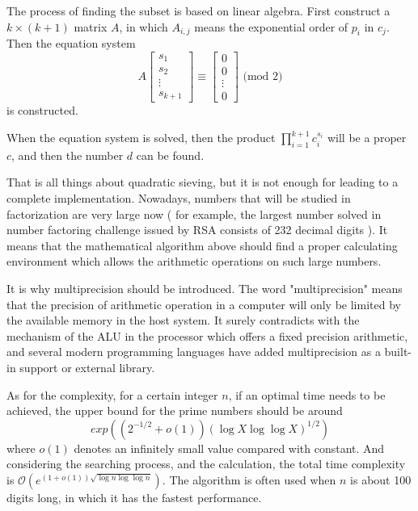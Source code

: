 \documentclass{article}
\begin{document}
The process of finding the subset is based on linear algebra. First construct a $k\times (k+1)$ matrix $A$, in which $A_{i,j}$ means the exponential order of $p_i$ in $c_j$. Then the equation system $$A\left[\begin{matrix}s_1\\s_2\\\vdots \\ s_{k+1}\end{matrix}\right] \equiv  \left[\begin{matrix}0\\0\\\vdots \\ 0\end{matrix}\right]\text{ (mod 2)}$$ is constructed. 

When the equation system is solved, then the product $\prod_{i=1}^{k+1}c_i^{s_{i}}$ will be a proper $c$, and then the number $d$ can be found.

That is all things about quadratic sieving, but it is not enough for leading to a complete implementation. Nowadays, numbers that will be studied in factorization are very large now ( for example, the largest number solved in number factoring challenge issued by RSA consists of 232 decimal digits ). It means that the mathematical algorithm above should find a proper calculating environment which allows the arithmetic operations on such large numbers. 

It is why multiprecision should be introduced. The word "multiprecision" means that the precision of arithmetic operation in a computer will only be limited by the available memory in the host system. It surely contradicts with the mechanism of the ALU in the processor which offers a fixed precision arithmetic, and several modern programming languages have added multiprecision as a built-in support or external library.

As for the complexity, for a certain integer $n$, if an optimal time needs to be achieved, the upper bound for the prime numbers should be around $$exp((2^{-1/2}+o(1))(\log{X}\log{\log{X}})^{1/2})$$ where $o(1)$ denotes an infinitely small value compared with constant. And considering the searching process, and the calculation, the total time complexity is $\mathcal{O}(e^{(1+o(1))\sqrt{\log{n}\log{\log{n}}}})$. The algorithm is often used when $n$ is about 100 digits long, in which it has the fastest performance.
\end{document}
